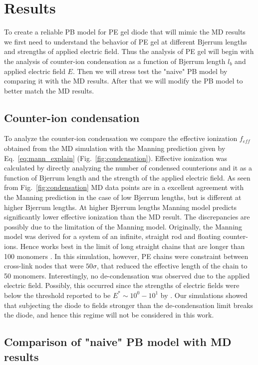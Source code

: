 \documentclass[twoside,twocolumn,9pt]{article}
\begin{document}
\section{Results}
To create a reliable PB model for PE gel diode that will mimic the MD results we first need to understand the behavior of PE gel at different Bjerrum lengths and strengths of applied electric field. Thus the analysis of PE gel will begin with the analysis of counter-ion condensation as a function of Bjerrum length $l_b$ and applied electric field $E$. Then we will stress test the "naive" PB model by comparing it with the MD results. After that we will modify the PB model to better match the MD results.

\subsection{Counter-ion condensation}
To analyze the counter-ion condensation we compare the effective ionization $f_{eff}$ obtained from the MD simulation with the Manning prediction given by Eq.~\eqref{eq:mann_explain} (Fig.~\ref{fig:condensation}). Effective ionization was calculated by directly analyzing the number of condensed counterions and it as a function of Bjerrum length and the strength of the applied electric field. As seen from Fig.~\ref{fig:condensation} MD data points are in a excellent agreement with the Manning prediction in the case of low Bjerrum lengths, but is different at  higher Bjerrum lengths. At higher Bjerrum lengths Manning model predicts significantly lower effective ionization than the MD result. The discrepancies are possibly due to the limitation of the Manning model. Originally, the Manning model was derived for a system of an infinite, straight rod and floating counter-ions. Hence works best in the limit of long straight chains that are longer than 100 monomers \cite{Erbas:2015jpa,Erbas:2016do,Li2016}. In this simulation, however, PE chains were constraint between cross-link nodes that were $50 \sigma$, that reduced the effective length of the chain to 50 monomers. Interestingly, no de-condensation was observed due to the applied electric field. Possibly, this occurred since the strengths of electric fields were below the threshold reported to be $E^{*}\sim 10^{0} - 10^{1}$ by \citep{Li2016IonicHydrogels}. Our simulations showed that subjecting the diode to fields stronger than the de-condensation limit breaks the diode, and hence this regime will not be considered in this work.

\subsection{Comparison of "naive" PB model with MD results}
\end{document}
